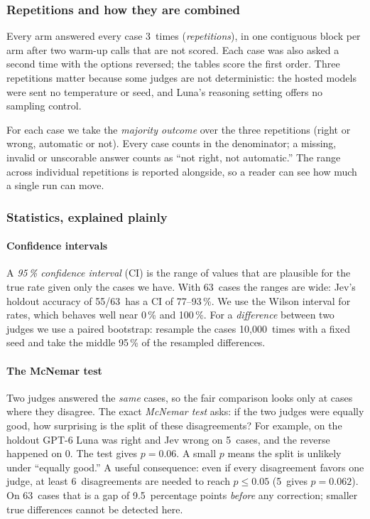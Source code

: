 \documentclass[11pt,letterpaper]{article}
\newcommand{\term}[1]{\emph{#1}}
\newcommand{\BootstrapB}{10{,}000}
\newcommand{\DevReps}{3}
\newcommand{\HoldMinDetectPts}{9.5}
\newcommand{\HoldN}{63}
\newcommand{\JevHoldAccCI}{77--93\,\%}
\newcommand{\JevHoldAccK}{55}
\newcommand{\LunaHoldRAccBaseOnly}{0}
\newcommand{\LunaHoldRAccCandOnly}{5}
\newcommand{\LunaHoldRAccP}{0.06}
\newcommand{\MinDiscordant}{6}
\newcommand{\MinDiscordantPrev}{5}
\newcommand{\MinDiscordantPrevP}{0.062}
\begin{document}
\subsubsection{Repetitions and how they are combined}

Every arm answered every case \DevReps\ times (\term{repetitions}), in one contiguous block per arm after
two warm-up calls that are not scored. Each case was also asked a second time with the options reversed;
the tables score the first order. Three repetitions matter because some judges are not deterministic:
the hosted models were sent no temperature or seed, and Luna's reasoning setting offers no sampling
control.

\begin{keyidea}
For each case we take the \term{majority outcome} over the three repetitions (right or wrong,
automatic or not). Every case counts in the denominator; a missing, invalid or unscorable answer counts
as ``not right, not automatic.'' The range across individual repetitions is reported alongside, so a
reader can see how much a single run can move.
\end{keyidea}

\subsubsection{Statistics, explained plainly}\label{jb:sec:stats}

\paragraph{Confidence intervals} A \term{95\,\% confidence interval} (CI) is the range of values that
are plausible for the true rate given only the cases we have. With \HoldN\ cases the ranges are wide:
Jev's holdout accuracy of \JevHoldAccK/\HoldN\ has a CI of \JevHoldAccCI. We use the Wilson interval for
rates, which behaves well near 0\,\% and 100\,\%. For a \emph{difference} between two judges we use a
paired bootstrap: resample the cases \BootstrapB\ times with a fixed seed and take the middle 95\,\% of
the resampled differences.

\paragraph{The McNemar test} Two judges answered the \emph{same} cases, so the fair comparison looks
only at cases where they disagree. The exact \term{McNemar test} asks: if the two judges were equally
good, how surprising is the split of these disagreements? For example, on the holdout GPT-6 Luna was
right and Jev wrong on \LunaHoldRAccCandOnly\ cases, and the reverse happened on
\LunaHoldRAccBaseOnly. The test gives $p = \LunaHoldRAccP$. A small $p$ means the split is unlikely
under ``equally good.'' A useful consequence: even if every disagreement favors one judge, at least
\MinDiscordant\ disagreements are needed to reach $p \le 0.05$ (\MinDiscordantPrev\ gives
$p = \MinDiscordantPrevP$). On \HoldN\ cases that is a gap of \HoldMinDetectPts\ percentage points
\emph{before} any correction; smaller true differences cannot be detected here.
\end{document}
